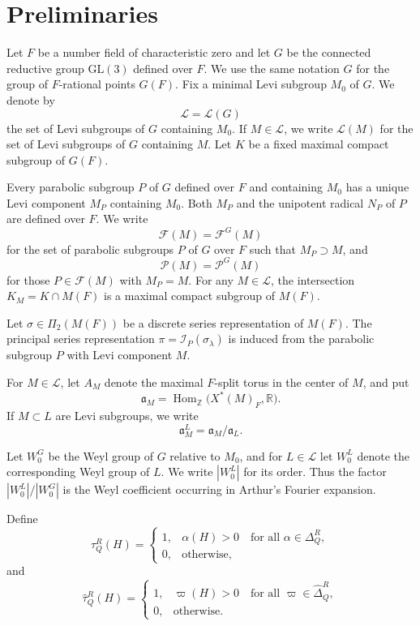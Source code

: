 \documentclass[11pt]{amsart}
\newcommand{\GGL}{\mathrm{GL}}
\theoremstyle{definition}
\numberwithin{equation}{section}
\begin{document}
	
	\section{Preliminaries}
	Let \(F\) be a number field of characteristic zero and let \(G\) be the connected
	reductive group \(\GGL(3)\) defined over \(F\). We use the same notation \(G\) for the group
	of \(F\)-rational points \(G(F)\). Fix a minimal Levi subgroup \(M_0\) of \(G\).
	We denote by
	\[
	\mathcal{L}=\mathcal{L}(G)
	\]
	the set of Levi subgroups of \(G\) containing \(M_0\). If \(M\in\mathcal{L}\),
	we write \(\mathcal{L}(M)\) for the set of Levi subgroups of \(G\) containing
	\(M\). Let \( K \) be a fixed maximal compact subgroup of \( G(F) \). 
	
	
	Every parabolic subgroup \( P \) of \( G \) defined over \( F \) and containing \( M_0 \) has a unique Levi component \( M_P \) containing \( M_0 \). Both \( M_P \) and the unipotent radical \( N_P \) of \(P\) are defined over \( F \). We write \[ \mathcal{F}(M) = \mathcal{F}^G(M) \] for the set of parabolic subgroups \( P \) of \( G \) over \( F \) such that \( M_P \supset M \), and \[ \mathcal{P}(M) = \mathcal{P}^G(M) \] for those \( P \in \mathcal{F}(M) \) with \( M_P = M \). For any \( M \in \mathcal{L} \), the intersection \( K_M = K \cap M(F) \) is a maximal compact subgroup of \( M(F) \).
	
	
	Let \(\sigma \in \Pi_2(M(F))\) be a discrete series representation of \(M(F)\).
	The principal series representation \(\pi = \mathcal{I}_P(\sigma_\lambda)\) is 
	induced from the parabolic subgroup \(P\) with Levi component \(M\).
	
	
	For \(M\in\mathcal{L}\), let \(A_M\) denote the maximal \(F\)-split torus in
	the center of \(M\), and put
	\[
	\mathfrak a_M
	= \operatorname{Hom}_{\mathbb Z}
	\bigl(X^*(M)_F,\mathbb R\bigr).
	\]
	If \(M\subset L\) are Levi subgroups, we write
	\[
	\mathfrak a_M^L=\mathfrak a_M/\mathfrak a_L.
	\]
	
	Let \(W_0^G\) be the Weyl group of \(G\) relative to \(M_0\), and for
	\(L\in\mathcal{L}\) let \(W_0^L\) denote the corresponding Weyl group of \(L\).
	We write \(|W_0^L|\) for its order. Thus the factor
	\(
	|W_0^L|/|W_0^G|
	\)
	is the Weyl coefficient occurring in Arthur's Fourier expansion.
	
	
	Define \[
	\tau_Q^R(H)
	=
	\begin{cases}
		1,
		&
		\alpha(H)>0
		\quad
		\text{for all }\alpha\in\Delta_Q^R,
		\\
		0,
		&
		\text{otherwise},
	\end{cases}
	\] and \[
	\widehat{\tau}_Q^R(H)
	=
	\begin{cases}
		1,
		&
		\varpi(H)>0
		\quad
		\text{for all }\varpi\in\widehat{\Delta}_Q^R,
		\\
		0,
		&
		\text{otherwise}.
	\end{cases}
	\]
	
\end{document}
